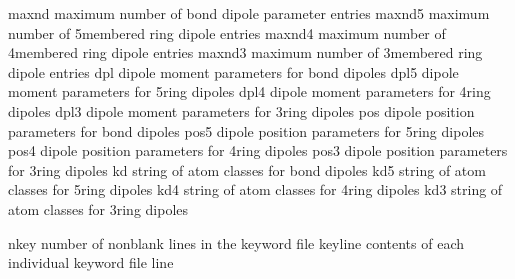 \documentclass[letterpaper,11pt,english]{sphinxmanual}
\begin{document}
\begin{sphinxVerbatim}[commandchars=\\\{\}]
maxnd           maximum number of bond dipole parameter entries
maxnd5          maximum number of 5\PYGZhy{}membered ring dipole entries
maxnd4          maximum number of 4\PYGZhy{}membered ring dipole entries
maxnd3          maximum number of 3\PYGZhy{}membered ring dipole entries
dpl             dipole moment parameters for bond dipoles
dpl5            dipole moment parameters for 5\PYGZhy{}ring dipoles
dpl4            dipole moment parameters for 4\PYGZhy{}ring dipoles
dpl3            dipole moment parameters for 3\PYGZhy{}ring dipoles
pos             dipole position parameters for bond dipoles
pos5            dipole position parameters for 5\PYGZhy{}ring dipoles
pos4            dipole position parameters for 4\PYGZhy{}ring dipoles
pos3            dipole position parameters for 3\PYGZhy{}ring dipoles
kd              string of atom classes for bond dipoles
kd5             string of atom classes for 5\PYGZhy{}ring dipoles
kd4             string of atom classes for 4\PYGZhy{}ring dipoles
kd3             string of atom classes for 3\PYGZhy{}ring dipoles
\end{sphinxVerbatim}


\begin{sphinxVerbatim}[commandchars=\\\{\}]
nkey            number of nonblank lines in the keyword file
keyline         contents of each individual keyword file line
\end{sphinxVerbatim}

\end{document}
